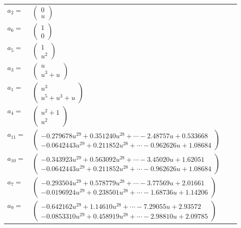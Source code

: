 \documentclass[1p]{elsarticle_modified}
\theoremstyle{definition}
\begin{document}
\begin{tabular}{m{7pt} m{180pt} m{7pt} m{180pt} }
\flushright $a_{2}=$&$\begin{pmatrix}0\\u\end{pmatrix}$ \\
\flushright $a_{6}=$&$\begin{pmatrix}1\\0\end{pmatrix}$ \\
\flushright $a_{5}=$&$\begin{pmatrix}1\\u^2\end{pmatrix}$ \\
\flushright $a_{3}=$&$\begin{pmatrix}u\\u^3+u\end{pmatrix}$ \\
\flushright $a_{1}=$&$\begin{pmatrix}u^3\\u^5+u^3+u\end{pmatrix}$ \\
\flushright $a_{4}=$&$\begin{pmatrix}u^2+1\\u^2\end{pmatrix}$ \\
\flushright $a_{11}=$&$\begin{pmatrix}-0.279678 u^{29}+0.351240 u^{28}+\cdots-2.48757 u+0.533668\\-0.0642443 u^{29}+0.211852 u^{28}+\cdots-0.962626 u+1.08684\end{pmatrix}$ \\
\flushright $a_{10}=$&$\begin{pmatrix}-0.343923 u^{29}+0.563092 u^{28}+\cdots-3.45020 u+1.62051\\-0.0642443 u^{29}+0.211852 u^{28}+\cdots-0.962626 u+1.08684\end{pmatrix}$ \\
\flushright $a_{7}=$&$\begin{pmatrix}-0.293504 u^{29}+0.578779 u^{28}+\cdots-3.77569 u+2.01661\\-0.0196924 u^{29}+0.238501 u^{28}+\cdots-1.68736 u+1.14206\end{pmatrix}$ \\
\flushright $a_{9}=$&$\begin{pmatrix}-0.642162 u^{29}+1.14610 u^{28}+\cdots-7.29055 u+2.93572\\-0.0853310 u^{29}+0.458919 u^{28}+\cdots-2.98810 u+2.09785\end{pmatrix}$ \\

\end{tabular}
\end{document}
